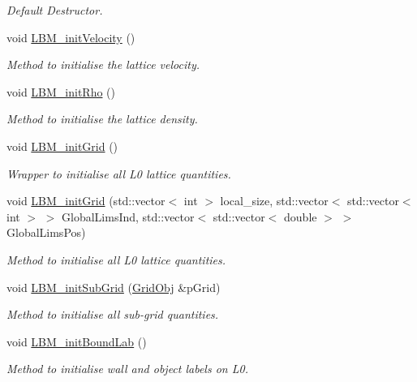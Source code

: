 \begin{DoxyCompactItemize}
\begin{DoxyCompactList}\small\item\em Default Destructor. \end{DoxyCompactList}\item 
void \hyperlink{class_grid_obj_aa8041f7344af6cf9732199aa107fdbc6}{L\+B\+M\+\_\+init\+Velocity} ()
\begin{DoxyCompactList}\small\item\em Method to initialise the lattice velocity. \end{DoxyCompactList}\item 
void \hyperlink{class_grid_obj_aac0e8a3fe74c69b3308ef3e19100f95c}{L\+B\+M\+\_\+init\+Rho} ()
\begin{DoxyCompactList}\small\item\em Method to initialise the lattice density. \end{DoxyCompactList}\item 
void \hyperlink{class_grid_obj_aeea74cc13001620abec1ba819233f714}{L\+B\+M\+\_\+init\+Grid} ()
\begin{DoxyCompactList}\small\item\em Wrapper to initialise all L0 lattice quantities. \end{DoxyCompactList}\item 
void \hyperlink{class_grid_obj_adfbe5c22b6b6f076615ea7b77c2d7cc4}{L\+B\+M\+\_\+init\+Grid} (std\+::vector$<$ int $>$ local\+\_\+size, std\+::vector$<$ std\+::vector$<$ int $>$ $>$ Global\+Lims\+Ind, std\+::vector$<$ std\+::vector$<$ double $>$ $>$ Global\+Lims\+Pos)
\begin{DoxyCompactList}\small\item\em Method to initialise all L0 lattice quantities. \end{DoxyCompactList}\item 
void \hyperlink{class_grid_obj_a697f4d7fc6c9ed18e609528847b1e175}{L\+B\+M\+\_\+init\+Sub\+Grid} (\hyperlink{class_grid_obj}{Grid\+Obj} \&p\+Grid)
\begin{DoxyCompactList}\small\item\em Method to initialise all sub-\/grid quantities. \end{DoxyCompactList}\item 
void \hyperlink{class_grid_obj_a4b6edceeda49496365e725eb67931961}{L\+B\+M\+\_\+init\+Bound\+Lab} ()
\begin{DoxyCompactList}\small\item\em Method to initialise wall and object labels on L0. \end{DoxyCompactList}\item 

\end{DoxyCompactItemize}
